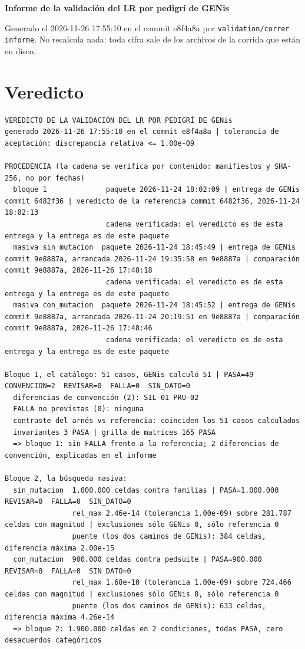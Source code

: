 \documentclass[11pt,a4paper]{article}
\begin{document}
\thispagestyle{fancy}
{\LARGE\bfseries Informe de la validación del LR por pedigrí de GENis\par}
\vspace{1.2em}
Generado el 2026-11-26 17:55:10 en el commit e8f4a8a por \texttt{validation/\allowbreak{}correr informe}. No recalcula nada: toda cifra sale de los archivos de la corrida que están en disco.

\tableofcontents

\section{Veredicto}
\begin{Verbatim}
VEREDICTO DE LA VALIDACIÓN DEL LR POR PEDIGRÍ DE GENis
generado 2026-11-26 17:55:10 en el commit e8f4a8a | tolerancia de aceptación: discrepancia relativa <= 1.00e-09

PROCEDENCIA (la cadena se verifica por contenido: manifiestos y SHA-256, no por fechas)
  bloque 1              paquete 2026-11-24 18:02:09 | entrega de GENis commit 6482f36 | veredicto de la referencia commit 6482f36, 2026-11-24 18:02:13
                        cadena verificada: el veredicto es de esta entrega y la entrega es de este paquete
  masiva sin_mutacion  paquete 2026-11-24 18:45:49 | entrega de GENis commit 9e8887a, arrancada 2026-11-24 19:35:58 en 9e8887a | comparación commit 9e8887a, 2026-11-26 17:48:18
                        cadena verificada: el veredicto es de esta entrega y la entrega es de este paquete
  masiva con_mutacion  paquete 2026-11-24 18:45:52 | entrega de GENis commit 9e8887a, arrancada 2026-11-24 20:19:51 en 9e8887a | comparación commit 9e8887a, 2026-11-26 17:48:46
                        cadena verificada: el veredicto es de esta entrega y la entrega es de este paquete

Bloque 1, el catálogo: 51 casos, GENis calculó 51 | PASA=49  CONVENCION=2  REVISAR=0  FALLA=0  SIN_DATO=0
  diferencias de convención (2): SIL-01 PRU-02
  FALLA no previstas (0): ninguna
  contraste del arnés vs referencia: coinciden los 51 casos calculados
  invariantes 3 PASA | grilla de matrices 165 PASA
  => bloque 1: sin FALLA frente a la referencia; 2 diferencias de convención, explicadas en el informe

Bloque 2, la búsqueda masiva:
  sin_mutacion  1.000.000 celdas contra familias | PASA=1.000.000  REVISAR=0  FALLA=0  SIN_DATO=0
                rel_max 2.46e-14 (tolerancia 1.00e-09) sobre 281.787 celdas con magnitud | exclusiones sólo GENis 0, sólo referencia 0
                puente (los dos caminos de GENis): 384 celdas, diferencia máxima 2.00e-15
  con_mutacion  900.000 celdas contra pedsuite | PASA=900.000  REVISAR=0  FALLA=0  SIN_DATO=0
                rel_max 1.68e-10 (tolerancia 1.00e-09) sobre 724.466 celdas con magnitud | exclusiones sólo GENis 0, sólo referencia 0
                puente (los dos caminos de GENis): 633 celdas, diferencia máxima 4.26e-14
  => bloque 2: 1.900.000 celdas en 2 condiciones, todas PASA, cero desacuerdos categóricos


\end{Verbatim}
\end{document}
